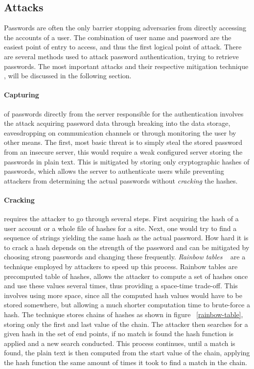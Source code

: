 \subsection{Attacks}
Passwords are often the only barrier stopping adversaries from directly accessing the accounts of a user. The combination of user name and password are the easiest point of entry to access, and thus the first logical point of attack. There are several methods used to attack password authentication, trying to retrieve passwords. The most important attacks and their respective mitigation technique \cite{nist-guide, strong-pws_florencio}, will be discussed in the following section. 
\paragraph{Capturing} of passwords directly from the server responsible for the authentication involves the attack acquiring password data through breaking into the data storage, eavesdropping on communication channels or through monitoring the user by other means. The first, most basic threat is to simply steal the stored password from an insecure server, this would require a weak configured server storing the passwords in plain text. This is mitigated by storing only cryptographic hashes of passwords, which allows the server to authenticate users while preventing attackers from determining the actual passwords without \emph{cracking} the hashes.

\paragraph{Cracking} requires the attacker to go through several steps. First acquiring the hash of a user account or a whole file of hashes for a site. Next, one would try to find a sequence of strings yielding the same hash as the actual password. How hard it is to crack a hash depends on the strength of the password and can be mitigated by choosing strong passwords and changing these frequently.\emph{ Rainbow tables }~\cite{rainbow-tables} are a technique employed by attackers to speed up this process. Rainbow tables are precomputed table of hashes, allows the attacker to compute a set of hashes once and use these values several times, thus providing a space-time trade-off. This involves using more space, since all the computed hash values would have to be stored somewhere, but allowing a much shorter computation time to brute-force a hash. The technique stores chains of hashes as shown in figure ~\ref{rainbow-table}, storing only the first and last value of the chain. The attacker then searches for a given hash in the set of end points, if no match is found the hash function is applied and a new search conducted. This process continues, until a match is found, the plain text is then computed from the start value of the chain, applying the hash function the same amount of times it took to find a match in the chain. 



